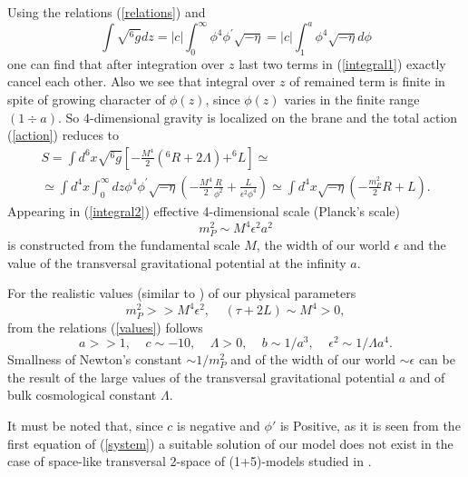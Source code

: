 \documentclass[a4paper,a4paper]{article}
\begin{document}
Using the relations (\ref{relations}) and
\begin{equation} \label{dz}
\int \sqrt{^6g}dz =
|c|\int_0^\infty \phi^4\phi^{'}\sqrt{-\eta}
= |c|\int_1^a  \phi^4\sqrt{-\eta} d\phi
\end{equation}
one can find that after integration over $z$ last two
terms in (\ref{integral1}) exactly cancel each other. Also we see
that integral over $z$ of remained term is finite in spite of
growing character of $\phi (z) $, since  $\phi (z) $ varies in the
finite range $(1 \div a)$. So 4-dimensional gravity is
localized on the brane and the total action (\ref{action})
reduces to
\begin{eqnarray} \label{integral2}
S = \int d^6x \sqrt{^6g}\left[- \frac{M^4}{2}(^6R + 2 \Lambda) +
^6L\right] \simeq \nonumber \\
\simeq  \int d^4x\int_0^\infty dz \phi^4
\phi^{'}\sqrt{-\eta}\left( -\frac{M^4}{2}\frac{R}{\phi^2} +
\frac{L}{\epsilon^2\phi^4} \right) \simeq \int
d^4x\sqrt{-\eta}\left(-\frac{m^2_P}{2}R + L\right) .
\end{eqnarray}
Appearing in (\ref{integral2}) effective 4-dimensional scale
(Planck's scale)
\begin{equation} \label{m_P}
m^2_P \sim M^4\epsilon^2 a^2
\end{equation}
is constructed from the fundamental scale $M$, the width of our
world $\epsilon$ and the value of the transversal gravitational
potential at the infinity $a$.

For the realistic values (similar to \cite{ADD}) of our physical
parameters
\begin{equation} \label{assumptions}
m^2_P >> M^4\epsilon^2, ~~~~~(\tau + 2L) \sim M^4 > 0,
\end{equation}
from the relations (\ref{values}) follows
\begin{equation} \label{estimations}
a >> 1, ~~~~~ c \sim - 10, ~~~~~ \Lambda > 0, ~~~~~ b \sim 1/a^3,
~~~~~ \epsilon^2 \sim 1/\Lambda a^4.
\end{equation}
Smallness of Newton's constant $\sim 1/m^2_P$ and of the width of
our world $\sim \epsilon $ can be the result of the large values
of the transversal gravitational potential $a$ and of bulk
cosmological constant $\Lambda $.

It must be noted that, since $c$ is negative and $\phi'$ is
Positive, as it is seen from the first equation of (\ref{system})
a suitable solution of our model does not exist in the case of
space-like transversal 2-space of (1+5)-models studied in
\cite{OlVi,ChPo,CoKa,Gr,GhSh,GiMeSh,Gi}.
\end{document}
